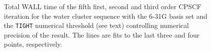 \documentclass[prl,aps,twocolumn,showpacs,twocolumngrid,superbib]{revtex4}
\begin{document}
\begin{figure}[t]
  \caption{\protect
    Total WALL time of the fifth first, second and third order
    CPSCF iteration for the water cluster sequence with the 6-31G
    basis set and the {\tt TIGHT} numerical threshold (see text) 
    controlling numerical precision of the result. The lines
    are fits to the last three and four points, respectively.
  }\label{Mix_scaling}
\end{figure}
\end{document}
